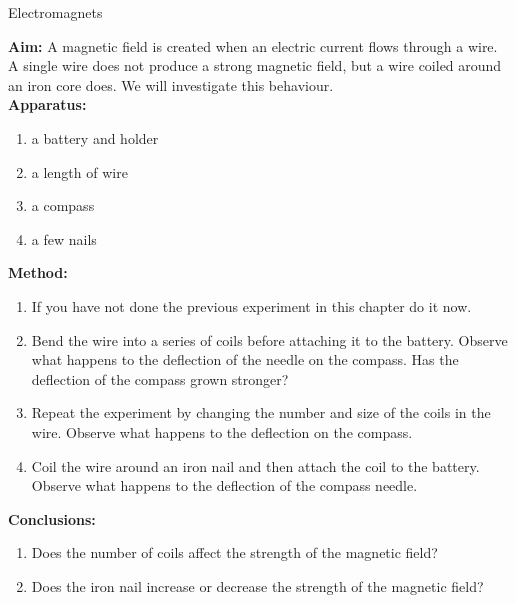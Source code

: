 \begin{g_experiment}{Electromagnets}{\textbf{Aim: } A magnetic field is created when an electric current flows through a wire. A single wire does not produce a strong magnetic field, but a wire coiled around an iron core does. We will investigate this behaviour.\\
\textbf{Apparatus: }
\begin{enumerate}
\item a battery and holder
\item a length of wire
\item a compass
\item a few nails
\end{enumerate}
\textbf{Method: }
\begin{enumerate}
\item If you have not done the previous experiment in this chapter do it now.
\item Bend the wire into a series of coils before attaching it to the battery. Observe what happens to the deflection of the needle on the compass. Has the deflection of the compass grown stronger?
\item Repeat the experiment by changing the number and size of the coils in the wire. Observe what happens to the deflection on the compass.
\item Coil the wire around an iron nail and then attach the coil to the battery. Observe what happens to the deflection of the compass needle.
\end{enumerate}
\textbf{Conclusions: }
\begin{enumerate}
\item Does the number of coils affect the strength of the magnetic field?
\item Does the iron nail increase or decrease the strength of the magnetic field?
\end{enumerate}
}
\end{g_experiment}

